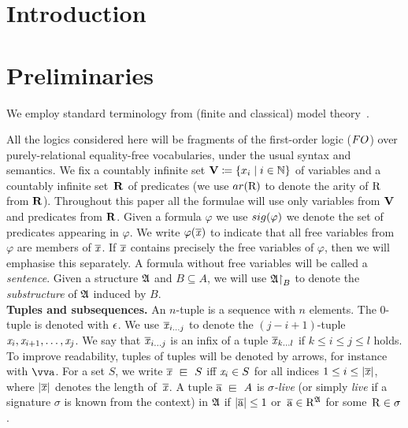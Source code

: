 \documentclass[a4paper, UKenglish, cleveref, numberwithinsect, autoref]{lipics-v2021}
\begin{document}
\maketitle
\hideLIPIcs

\begin{abstract}
\end{abstract}

\section{Introduction}\label{sec:intro}


\section{Preliminaries}\label{sec:preliminaries}
We employ standard terminology from (finite and classical) model theory~\cite{Hodges97,Libkin04}.

All the logics considered here will be fragments of the first-order logic ($\FO$) over purely-relational equality-free vocabularies, under the usual syntax and semantics. 
We fix a countably infinite set $\mathbf{V} \coloneqq \{x_i \mid i \in {\mathbb{N}}\}$ of variables and a countably infinite set~$\mathbf{R}$ of predicates (we use $\arity(\relR)$ to denote the arity of $\mathrm{R}$ from $\mathbf{R}$). 
Throughout this paper all the formulae will use only variables from $\mathbf{V}$ and predicates from $\mathbf{R}$.
Given a formula $\varphi$ we use $\sig(\varphi)$ we denote the set of predicates appearing in $\varphi$. 
We write $\varphi(\overline{\mathit{x}})$ to indicate that all free variables from $\varphi$ are members of $\overline{\mathit{x}}$. 
If $\overline{\mathit{x}}$ contains precisely the free
variables of $\varphi$, then we will emphasise this separately.
A formula without free variables will be called a \emph{sentence}.
Given a structure ${\mathfrak{A}}$ and $B \subseteq A$, we will use ${\mathfrak{A}}\mathord{\upharpoonright}_{B}$ to denote the \emph{substructure} of ${\mathfrak{A}}$ induced by $B$.\\

\noindent \textbf{Tuples and subsequences.}
An $n$-tuple is a sequence with $n$ elements. The $0$-tuple is denoted with $\epsilon$.
We use $\overline{\mathit{x}}_{i\ldots j}$ to denote the $(j{-}i{+}1)$-tuple $\mathit{x}_i, \mathit{x}_{i+1}, \ldots, \mathit{x}_j$.
We say that $\overline{\mathit{x}}_{i\ldots j}$ is an infix of a tuple $\overline{\mathit{x}}_{k\ldots l}$ if $k \leq i \leq j \leq l$ holds. 
To improve readability, tuples of tuples will be denoted by arrows, for instance with $\elemtuptuplea$.
For a set $S$, we write $\vartuplex \sqin S$ iff $\mathit{x}_i \in S$ for all indices $1 \leq i \leq |\overline{\mathit{x}}|$, where $|\overline{\mathit{x}}|$ denotes the length of~$\overline{\mathit{x}}$. 
A tuple $\elemtuplea \sqin A$ is \emph{$\sigma$-live} (or simply \emph{live} if a signature $\sigma$ is known from the context) in ${\mathfrak{A}}$ if $|\overline{\mathrm{a}}| \leq 1$ or~$\overline{\mathrm{a}} \in \mathrm{R}^{{\mathfrak{A}}}$ for some~$\mathrm{R} \in \sigma$.\\
\end{document}
